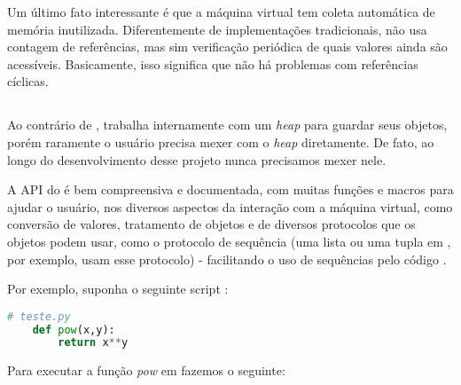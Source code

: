       Um último fato interessante é que a máquina virtual tem coleta automática
      de memória inutilizada. Diferentemente de implementações tradicionais,
       não usa contagem de referências, mas sim verificação periódica
      de quais valores ainda são acessíveis. Basicamente, isso significa que não
      há problemas com referências cíclicas.

    \subsection{}
    Ao contrário de ,  trabalha internamente com um
    \emph{heap} para guardar seus objetos, porém raramente o usuário precisa
    mexer com o \textit{heap} diretamente. De fato, ao longo do desenvolvimento 
    desse projeto nunca precisamos mexer nele.

    A API \C{} do  é bem compreensiva e documentada, com muitas funções e
    macros para ajudar o usuário, nos diversos aspectos da interação com a
    máquina virtual, como conversão de valores, tratamento de objetos e de
    diversos protocolos que os objetos podem usar, como o protocolo de sequência
    (uma lista ou uma tupla em , por exemplo, usam esse protocolo) -
    facilitando o uso de sequências pelo código \C{}.
    
    Por exemplo, suponha o seguinte script :
      
    \vspace{1em}

    \begin{lstlisting}[language=python]
    # teste.py
    def pow(x,y):
        return x**y
    \end{lstlisting}
      
    \vspace{1em}
    
    Para executar a função \emph{pow} em \CXX{} fazemos o seguinte:
      
    \vspace{1em}

